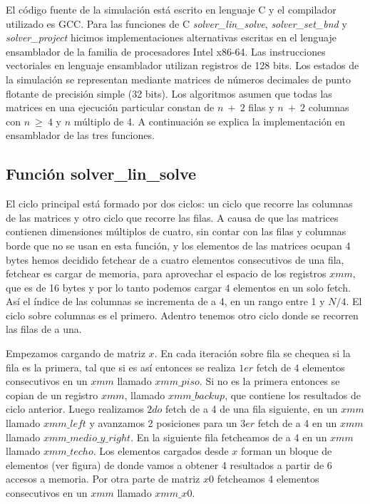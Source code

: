 El código fuente de la simulación está escrito en lenguaje C y el compilador utilizado es GCC. Para las funciones de C \textit{solver\_lin\_solve}, \textit{solver\_set\_bnd} y \textit{solver\_project} hicimos implementaciones alternativas escritas en el lenguaje ensamblador de la familia de procesadores Intel x86-64. Las instrucciones vectoriales en lenguaje ensamblador utilizan registros de 128 bits. Los estados de la simulación se representan mediante matrices de números decimales de punto flotante de precisión simple (32 bits). Los algoritmos asumen que todas las matrices en una ejecución particular constan de $n\ +\ 2$ filas y $n\ +\ 2$ columnas con $n\ \geq\ 4$ y $n$ múltiplo de 4. A continuación se explica la implementación en ensamblador de las tres funciones.
\subsection{Función solver\_lin\_solve}
El ciclo principal está formado por dos ciclos: un ciclo que recorre las columnas de las matrices y
 otro ciclo que recorre las filas. A causa de que las matrices contienen dimensiones múltiplos de 
 cuatro, sin contar con las filas y columnas borde que no se usan en esta función, y los elementos
 de las matrices ocupan 4 bytes hemos decidido fetchear de a cuatro elementos consecutivos
 de una fila, fetchear es cargar de memoria, para aprovechar el espacio de los registros $xmm$, que es
 de 16 bytes y por lo tanto podemos cargar 4 elementos en un solo fetch. Así el índice de
 las columnas se incrementa de a 4, en un rango entre 1 y $N/4$. El ciclo sobre columnas es el primero.  
 Adentro tenemos otro ciclo donde se recorren las filas de a una. 

Empezamos cargando de matriz $x$.
 En cada iteración sobre fila se chequea si la fila es la primera, tal que si es así entonces 
 se realiza $1er$ fetch de 4 elementos consecutivos en un $xmm$ llamado $xmm\_piso$. Si no es la 
 primera entonces se copian de un registro $xmm$, llamado $xmm\_backup$, que contiene los 
 resultados de ciclo anterior.
Luego realizamos $2do$ fetch de a 4 de una fila siguiente, en un $xmm$ llamado
 $xmm\_left$ y avanzamos 2 posiciones para un $3er$ fetch de a 4 en un $xmm$ llamado $xmm\_medio\_y\_right$.
 En la siguiente fila fetcheamos de a 4 en un $xmm$ llamado $xmm\_techo$. Los elementos cargados desde $x$
 forman un bloque de elementos (ver figura) de donde vamos a obtener 4 resultados a partir de 6 
 accesos a memoria.
 Por otra parte de matriz $x0$ fetcheamos 4 elementos consecutivos en un $xmm$ llamado $xmm\_x0$.


